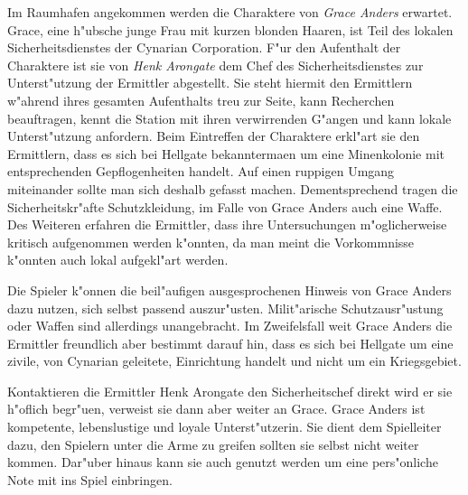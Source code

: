 Im Raumhafen angekommen werden die Charaktere von \emph{Grace Anders} erwartet. Grace, eine h"ubsche junge Frau mit kurzen blonden Haaren, ist Teil des lokalen Sicherheitsdienstes der Cynarian Corporation. F"ur den Aufenthalt der Charaktere ist sie von \emph{Henk Arongate} dem Chef des Sicherheitsdienstes zur Unterst"utzung der Ermittler abgestellt. Sie steht hiermit den Ermittlern w"ahrend ihres gesamten Aufenthalts treu zur Seite, kann Recherchen beauftragen, kennt die Station mit ihren verwirrenden G"angen und kann lokale Unterst"utzung anfordern. Beim Eintreffen der Charaktere erkl"art sie den Ermittlern, dass es sich bei Hellgate bekannterma\3en um eine Minenkolonie mit entsprechenden Gepflogenheiten handelt. Auf einen ruppigen Umgang miteinander sollte man sich deshalb gefasst machen. Dementsprechend tragen die Sicherheitskr"afte Schutzkleidung, im Falle von Grace Anders auch eine Waffe. Des Weiteren erfahren die Ermittler, dass ihre Untersuchungen m"oglicherweise kritisch aufgenommen werden k"onnten, da man meint die Vorkommnisse k"onnten auch lokal aufgekl"art werden.


\begin{remarks}
	Die Spieler k"onnen die beil"aufigen ausgesprochenen Hinweis von Grace Anders dazu nutzen, sich selbst passend auszur"usten. Milit"arische Schutzausr"ustung oder Waffen sind allerdings unangebracht. Im Zweifelsfall wei\3t Grace Anders die Ermittler freundlich aber bestimmt darauf hin, dass es sich bei Hellgate um eine zivile, von Cynarian geleitete, Einrichtung handelt und nicht um ein Kriegsgebiet. 
	
	Kontaktieren die Ermittler Henk Arongate den Sicherheitschef direkt wird er sie h"oflich begr"u\3en, verweist sie dann aber weiter an Grace. Grace Anders ist kompetente, lebenslustige und loyale Unterst"utzerin. Sie dient dem Spielleiter dazu, den Spielern unter die Arme zu greifen sollten sie selbst nicht weiter kommen. Dar"uber hinaus kann sie auch genutzt werden um eine pers"onliche Note mit ins Spiel einbringen.
\end{remarks}


